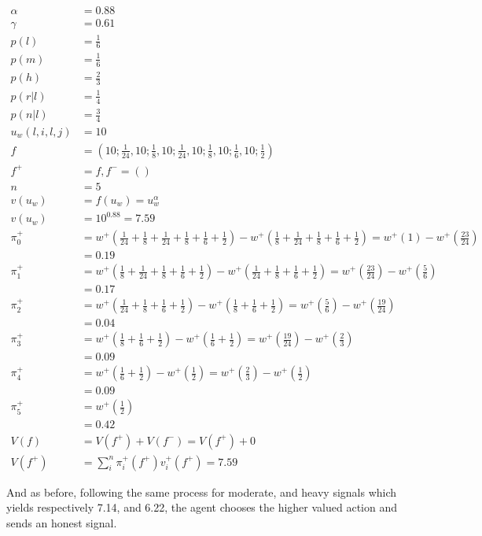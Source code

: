 \begin{equation*}
\begin{aligned}
\alpha &= 0.88\\
\gamma &= 0.61\\
p(l) &= \frac{1}{6}\\
p(m) &= \frac{1}{6}\\
p(h) &= \frac{2}{3}\\
p(r | l) &= \frac{1}{4}\\
p(n | l) &= \frac{3}{4}\\
u_{w}(l, i, l, j) &= 10\\
f&=(10;\frac{1}{24},10;\frac{1}{8},10;\frac{1}{24},10;\frac{1}{8},10;\frac{1}{6},10;\frac{1}{2})\\
f^{+}&=f,f^{-}=()\\
n &= 5\\
v(u_{w}) &= f(u_{w}) = u_{w}^\alpha\\
v(u_{w}) &= 10^{0.88} = 7.59\\
\pi_{0}^{+}&=w^{+}(\frac{1}{24} + \frac{1}{8} + \frac{1}{24} + \frac{1}{8} + \frac{1}{6} + \frac{1}{2}) - w^{+}(\frac{1}{8} + \frac{1}{24} + \frac{1}{8} + \frac{1}{6} + \frac{1}{2})=w^{+}(1) - w^{+}(\frac{23}{24})\\
&=0.19\\
\pi_{1}^{+}&=w^{+}(\frac{1}{8} + \frac{1}{24} + \frac{1}{8} + \frac{1}{6} + \frac{1}{2}) - w^{+}(\frac{1}{24} + \frac{1}{8} + \frac{1}{6} + \frac{1}{2})=w^{+}(\frac{23}{24}) - w^{+}(\frac{5}{6})\\
&= 0.17\\
\pi_{2}^{+}&=w^{+}(\frac{1}{24} + \frac{1}{8} + \frac{1}{6} + \frac{1}{2}) - w^{+}(\frac{1}{8} + \frac{1}{6} + \frac{1}{2})=w^{+}(\frac{5}{6}) - w^{+}(\frac{19}{24})\\
&= 0.04\\
\pi_{3}^{+}&=w^{+}(\frac{1}{8} + \frac{1}{6} + \frac{1}{2}) - w^{+}(\frac{1}{6} + \frac{1}{2})=w^{+}(\frac{19}{24}) - w^{+}(\frac{2}{3})\\
&= 0.09\\
\pi_{4}^{+}&=w^{+}(\frac{1}{6} + \frac{1}{2}) - w^{+}(\frac{1}{2})=w^{+}(\frac{2}{3}) - w^{+}(\frac{1}{2})\\
&= 0.09\\
\pi_{5}^{+}&=w^{+}(\frac{1}{2})\\
&= 0.42\\
V(f) &= V(f^{+}) + V(f^{-}) = V(f^{+}) + 0\\
V(f^{+}) &= \sum_{i}^{n}\pi_{i}^{+}(f^{+})v_{i}^{+}(f^{+}) = 7.59
\end{aligned}
\end{equation*}


And as before, following the same process for moderate, and heavy signals which yields respectively 7.14, and 6.22, the agent chooses the higher valued action and sends an honest signal.
